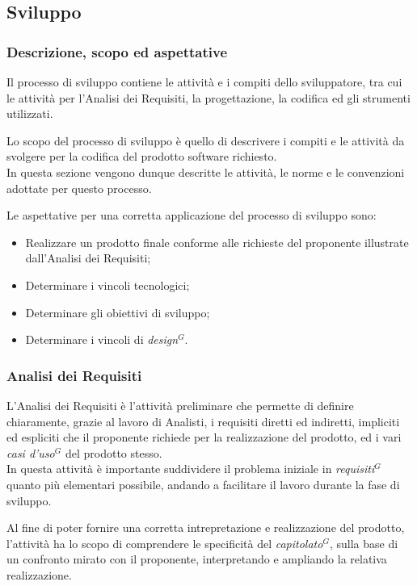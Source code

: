 \subsection{Sviluppo}

\subsubsection{Descrizione, scopo ed aspettative}

Il processo di sviluppo contiene le attività e i compiti dello sviluppatore, tra cui le attività per l’Analisi dei Requisiti, la progettazione, la codifica ed gli strumenti utilizzati.

Lo scopo del processo di sviluppo è quello di descrivere i compiti e le attività da svolgere per la codifica del prodotto software richiesto. \\
In questa sezione vengono dunque descritte le attività, le norme e le convenzioni adottate per questo processo.

Le aspettative per una corretta applicazione del processo di sviluppo sono:
\begin{itemize}
    \item Realizzare un prodotto finale conforme alle richieste del proponente illustrate dall'Analisi dei Requisiti;
    \item Determinare i vincoli tecnologici;
    \item Determinare gli obiettivi di sviluppo;
    \item Determinare i vincoli di \emph{design}$^{G}$.
\end{itemize}
\subsubsection{Analisi dei Requisiti}


L’Analisi dei Requisiti è l’attività preliminare che permette di definire chiaramente, grazie al lavoro di Analisti, i requisiti diretti ed indiretti,
impliciti ed espliciti che il proponente richiede per la realizzazione del prodotto, ed i vari \emph{casi d’uso}$^{G}$ del prodotto stesso. \\
In questa attività è importante suddividere il problema iniziale in \emph{requisiti}$^{G}$ quanto più elementari possibile, andando a facilitare il lavoro durante la fase di sviluppo.

Al fine di poter fornire una corretta intrepretazione e realizzazione del prodotto, l'attività ha lo scopo di comprendere le specificità del \emph{capitolato}$^{G}$, sulla base di un confronto mirato con il proponente, interpretando e ampliando la relativa realizzazione.
\pagebreak

